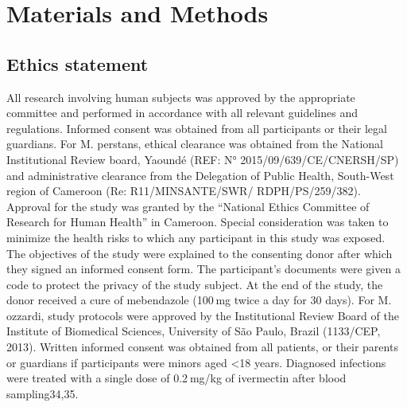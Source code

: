 \documentclass[10pt, a4paper, twocolumn]{article} %
\begin{document}
\section{Materials and Methods}

\subsection{Ethics statement}
All research involving human subjects was approved by the appropriate committee and performed in accordance with all relevant guidelines and regulations. Informed consent was obtained from all participants or their legal guardians.
For M. perstans, ethical clearance was obtained from the National Institutional Review board, Yaoundé (REF: N° 2015/09/639/CE/CNERSH/SP) and administrative clearance from the Delegation of Public Health, South-West region of Cameroon (Re: R11/MINSANTE/SWR/ RDPH/PS/259/382). Approval for the study was granted by the “National Ethics Committee of Research for Human Health” in Cameroon. Special consideration was taken to minimize the health risks to which any participant in this study was exposed. The objectives of the study were explained to the consenting donor after which they signed an informed consent form. The participant’s documents were given a code to protect the privacy of the study subject. At the end of the study, the donor received a cure of mebendazole (100 mg twice a day for 30 days).
For M. ozzardi, study protocols were approved by the Institutional Review Board of the Institute of Biomedical Sciences, University of São Paulo, Brazil (1133/CEP, 2013). Written informed consent was obtained from all patients, or their parents or guardians if participants were minors aged <18 years. Diagnosed infections were treated with a single dose of 0.2 mg/kg of ivermectin after blood sampling34,35.
\end{document}
